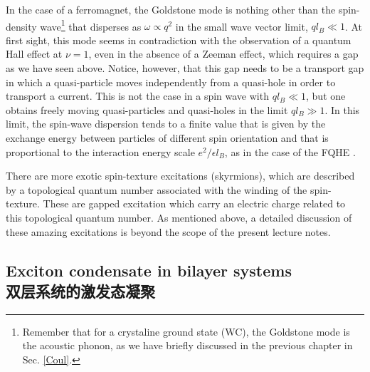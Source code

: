 \documentclass[10pt]{book}
\begin{document}
In the case of a ferromagnet, the Goldstone mode is nothing other than the spin-density wave\footnote{Remember
that for a crystaline ground state (WC), the Goldstone mode is the acoustic phonon, as we have briefly discussed
in the previous chapter in Sec. \ref{Coul}.} that disperses as $\omega\propto q^2$
in the small wave vector limit, $ql_B\ll 1$. At first sight, this mode seems in contradiction 
with the observation of a quantum Hall effect
at $\nu=1$, even in the absence of a Zeeman effect, which requires a gap as we have seen above. Notice, however, that 
this gap needs to be a transport gap in which a quasi-particle moves independently from a quasi-hole in order to transport a current.
This is not the case in a spin wave with $ql_B\ll 1$, but one obtains freely moving quasi-particles and quasi-holes in the 
limit $q l_B\gg 1$. In this limit, the spin-wave dispersion tends to a finite value that is given by the exchange energy between particles
of different spin orientation and that is proportional to the interaction energy scale $e^2/\epsilon l_B$, as in the case
of the FQHE \cite{moon}.

There are more exotic spin-texture excitations (skyrmions), which are described by a topological quantum number associated with
the winding of the spin-texture. These are gapped excitation which carry an electric charge related to this topological quantum
number. As mentioned above, a detailed discussion of these amazing excitations is beyond the scope of the present lecture notes.

\subsection[双层系统的激发态凝聚]{Exciton condensate in bilayer systems\\\bf 双层系统的激发态凝聚}
\label{BilayerFM}
\end{document}
